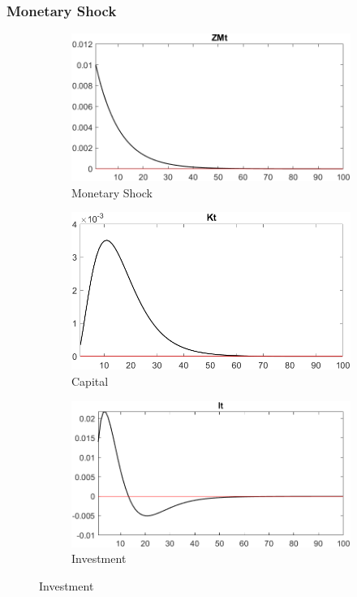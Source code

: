 \documentclass[
	12pt, 
	]{article}
\numberwithin{equation}{section}
\theoremstyle{definition}
\theoremstyle{plain}
\theoremstyle{plain}
\theoremstyle{plain}
\begin{document}
\newpage

\subsubsection{Monetary Shock}

\begin{figure}[h!]
	\centering
	\begin{subfigure}[b]{0.3\textwidth}
		\centering
		\includegraphics[width=\textwidth]{shock_ZMt/shock_ZMt_ZMt}
		\caption{Monetary Shock}
		\label{fig:ZMt-monetary-shock}
	\end{subfigure}
	\hfill
	\begin{subfigure}[b]{0.3\textwidth}
		\centering
		\includegraphics[width=\textwidth]{shock_ZMt/shock_ZMt_Kt}
		\caption{Capital}
		\label{fig:ZMt-capital}
	\end{subfigure}
	\hfill
	\begin{subfigure}[b]{0.3\textwidth}
		\centering
		\includegraphics[width=\textwidth]{shock_ZMt/shock_ZMt_It}
		\caption{Investment}
		\label{fig:ZMt-investment}
	\end{subfigure}
	\hfill
	

\end{figure}
\end{document}

